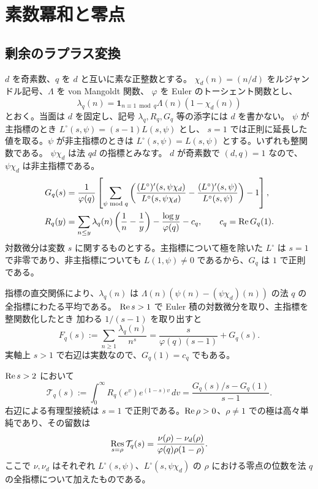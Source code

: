 \section{素数冪和と零点}\label{sec:analytic}

\subsection{剰余のラプラス変換}

\(d\) を奇素数、\(q\) を \(d\) と互いに素な正整数とする。
\(\chi_d(n)=(n/d)\) をルジャンドル記号、\(\Lambda\) を von Mangoldt 関数、
\(\varphi\) を Euler のトーシェント関数とし、
\[
  \lambda_q(n)=\mathbf 1_{n\equiv1\bmod q}\Lambda(n)(1-\chi_d(n))
\]
とおく。当面は \(d\) を固定し、記号 \(\lambda_q,R_q,G_q\) 等の添字には \(d\) を書かない。
\(\psi\) が主指標のとき \(L^\circ(s,\psi)=(s-1)L(s,\psi)\) とし、
\(s=1\) では正則に延長した値を取る。\(\psi\) が非主指標のときは
\(L^\circ(s,\psi)=L(s,\psi)\) とする。いずれも整関数である。
\(\psi\chi_d\) は法 \(qd\) の指標とみなす。
\(d\) が奇素数で \((d,q)=1\) なので、\(\psi\chi_d\) は非主指標である。
\begin{align}
  G_q(s)
   &=\frac1{\varphi(q)}
     \left[
       \sum_{\psi\bmod q}
       \left(
        \frac{(L^\circ)'(s,\psi\chi_d)}{L^\circ(s,\psi\chi_d)}
        -\frac{(L^\circ)'(s,\psi)}{L^\circ(s,\psi)}
       \right)-1
     \right], \label{eq:log-derivative}\\
  R_q(y)
   &= \sum_{n\le y}\lambda_q(n)\left(\frac1n-\frac1y\right)
      -\frac{\log y}{\varphi(q)}-c_q,\qquad c_q=\operatorname{Re} G_q(1).
  \label{eq:prime-remainder}
\end{align}
対数微分は変数 \(s\) に関するものとする。主指標について極を除いた
\(L^\circ\) は \(s=1\) で非零であり、非主指標についても \(L(1,\psi)\ne0\)
であるから、\(G_q\) は \(1\) で正則である。

指標の直交関係により、\(\lambda_q(n)\) は
\(\Lambda(n)(\psi(n)-(\psi\chi_d)(n))\) の法 \(q\) の全指標にわたる平均である。
\(\operatorname{Re} s>1\) で Euler 積の対数微分を取り、主指標を整関数化したとき
加わる \(1/(s-1)\) を取り出すと
\begin{equation}\label{eq:lambda-dirichlet}
  F_q(s):=\sum_{n\ge1}\frac{\lambda_q(n)}{n^s}
        =\frac{s}{\varphi(q)(s-1)}+G_q(s).
\end{equation}
実軸上 \(s>1\) で右辺は実数なので、\(G_q(1)=c_q\) でもある。

\begin{lemma}\label{lem:prime-transform}
\(\operatorname{Re} s>2\) において
\begin{equation}\label{eq:prime-transform}
  \mathcal T_q(s):=\int_0^\infty R_q(e^v)e^{(1-s)v}\,dv
     =\frac{G_q(s)/s-G_q(1)}{s-1}.
\end{equation}
右辺による有理型接続は \(s=1\) で正則である。\(\operatorname{Re} \rho>0\)、\(\rho\ne1\)
での極は高々単純であり、その留数は
\[
  \operatorname*{Res}_{s=\rho}\mathcal T_q(s)=
    \frac{\nu(\rho)-\nu_d(\rho)}{\varphi(q)\rho(1-\rho)}.
\]
ここで \(\nu,\nu_d\) はそれぞれ \(L^\circ(s,\psi)\)、\(L^\circ(s,\psi\chi_d)\)
の \(\rho\) における零点の位数を法 \(q\) の全指標について加えたものである。
\end{lemma}

